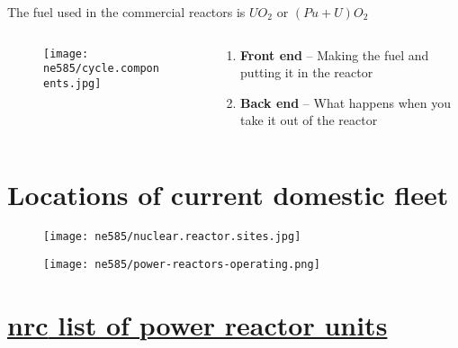 \documentclass[aspectratio=1610,pdftex,dvipsnames,compress,xcolor={dvipsnames}]{beamer}
\newcommand{\acs}{\acrshort} %
\begin{document}
\begin{frame}{The fuel used in the commercial reactors is $UO_2$ or $ (Pu+U)O_2$}
    \begin{columns}[t]

        \begin{column}{0.55\textwidth}
            \begin{figure}
                \centering
                \texttt{[image: ne585/cycle.components.jpg]}
            \end{figure}
        \end{column}

        \begin{column}{0.45\textwidth}
            \begin{enumerate}[series=outerlist,topsep=0pt,itemsep=21pt,leftmargin=*,label=(\arabic*)]
                \item[]\textbf{Front end} -- Making the fuel and putting it in the reactor
                \item[]\textbf{Back end} -- What happens when you take it out of the reactor
            \end{enumerate}
        \end{column}

    \end{columns}
\end{frame}


\section{Locations of current domestic fleet}


\addtocounter{framenumber}{-1} 
\begin{frame}{}
    \begin{figure}
        \centering
        \texttt{[image: ne585/nuclear.reactor.sites.jpg]}
    \end{figure}
\end{frame}


\begin{frame}{}
    \begin{figure}
        \centering
        \texttt{[image: ne585/power-reactors-operating.png]}
    \end{figure}
\end{frame}


\section{\href{https://www.nrc.gov/reactors/operating/list-power-reactor-units.html}{\acs{nrc} list of power reactor units}}
\end{document}
